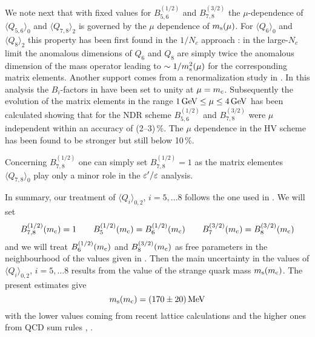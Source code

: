 We note next that with fixed values for $B_{5,6}^{(1/2)}$ and
$B_{7,8}^{(3/2)}$ the $\mu$-dependence of $\langle Q_{5,6} \rangle_0$
and $\langle Q_{7,8} \rangle_2$ is governed by the $\mu$ dependence of
$m_{\rm s}(\mu)$. For $\langle Q_6 \rangle_0$ and $\langle Q_8 \rangle_2$
this property has been first found in the $1/N_c$ approach
\cite{burasgerard:87}: in the large-$N_c$ limit the anomalous
dimensions of $Q_6$ and $Q_8$ are simply twice the anomalous dimension
of the mass operator leading to $\sim 1/m_{\rm s}^2(\mu)$ for the
corresponding matrix elements. Another support comes from a
renormalization study in \cite{burasetal:92d}. In this analysis the
$B_i$-factors in  have been set to unity at $\mu=m_{\rm c}$.
Subsequently the evolution of the matrix elements in the range $1\, {\rm GeV}
\le \mu \le 4\, {\rm GeV}$ has been calculated showing that for the NDR scheme
$B_{5,6}^{(1/2)}$ and $B_{7,8}^{(3/2)}$ were $\mu$ independent within
an accuracy of (2--3)\,\%. The $\mu$ dependence in the HV scheme has
been found to be stronger but still below 10\,\%.

Concerning $B_{7,8}^{(1/2)}$ one can simply set $B_{7,8}^{(1/2)}=1$ as
the matrix elementes $\langle Q_{7,8} \rangle_0$ play only a minor role
in the $\varepsilon'/\varepsilon$ analysis.

In summary, our treatment of $\langle Q_i \rangle_{0,2}$, $i=5,\ldots 8$
follows the one used in \cite{burasetal:92d}. We will set
\begin{equation}
B_{7,8}^{(1/2)}(m_{\rm c}) = 1
\qquad
B_5^{(1/2)}(m_{\rm c}) = B_6^{(1/2)}(m_{\rm c})
\qquad
B_7^{(3/2)}(m_{\rm c}) = B_8^{(3/2)}(m_{\rm c})
\label{eq:B1278mc}
\end{equation}
and we will treat $B_6^{(1/2)}(m_{\rm c})$ and $B_8^{(3/2)}(m_{\rm c})$ as free
parameters in the neighbourhood of the values given in .
Then the main uncertainty in the values of $\langle Q_i \rangle_{0,2}$,
$i=5,\ldots 8$ results from the value of the strange quark mass
$m_{\rm s}(m_{\rm c})$. The present estimates give
\begin{equation}
m_{\rm s}(m_{\rm c}) = (170 \pm 20)\, {\rm MeV}
\label{eq:msmc}
\end{equation}
with the lower values coming from recent lattice calculations
\cite{alltonetal:94} and the higher ones from QCD sum rules
\cite{jaminmuenz:95}, \cite{chetyrkinetal:95}.

